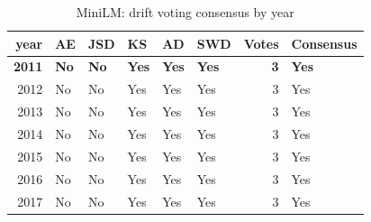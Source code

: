 \begin{table}[ht]
\centering
\caption{MiniLM: drift voting consensus by year}
\label{tab:minilm_consensus}
\begin{tabular}{rlllllrl}
\toprule
year & AE & JSD & KS & AD & SWD & Votes & Consensus \\
\midrule
\textbf{2011} & \textbf{No} & \textbf{No} & \textbf{Yes} & \textbf{Yes} & \textbf{Yes} & \textbf{3} & \textbf{Yes} \\
2012 & No & No & Yes & Yes & Yes & 3 & Yes \\
2013 & No & No & Yes & Yes & Yes & 3 & Yes \\
2014 & No & No & Yes & Yes & Yes & 3 & Yes \\
2015 & No & No & Yes & Yes & Yes & 3 & Yes \\
2016 & No & No & Yes & Yes & Yes & 3 & Yes \\
2017 & No & No & Yes & Yes & Yes & 3 & Yes \\
\bottomrule
\end{tabular}
\end{table}
